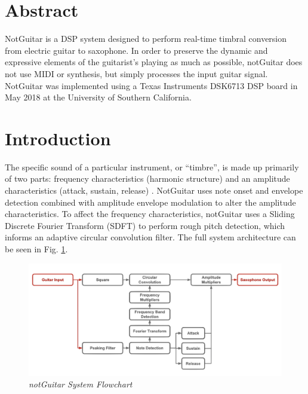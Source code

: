 \documentclass[twoside,a4paper]{article}
\title{\papertitle}
\newif\ifpdf
\begin{document}
\ifpdf %
  \DeclareGraphicsExtensions{.png,.jpg,.pdf}
\else  %
\fi

\maketitle
\section{Abstract}
NotGuitar is a DSP system designed to perform real-time timbral conversion from electric guitar to saxophone.
In order to preserve the dynamic and expressive elements of the guitarist's playing as much as possible,
notGuitar does not use MIDI or synthesis, but simply processes the input guitar signal. 
NotGuitar was implemented using a Texas Instruments DSK6713 DSP board in May 2018 at the University of
Southern California.

\section{Introduction}
The specific sound of a particular instrument, or ``timbre'', is made up primarily of two parts: frequency characteristics
(harmonic structure) and an amplitude characteristics (attack, sustain, release)
\cite{Zolzer:2011:DDA:2028616}. NotGuitar uses note onset and envelope detection combined with
amplitude envelope modulation to alter the amplitude characteristics.
To affect the frequency characteristics, notGuitar uses a Sliding Discrete Fourier Transform (SDFT)
to perform rough pitch detection, which informs
an adaptive circular convolution filter.
The full system architecture can be seen in Fig. \ref{flowchart}.

\begin{figure}[ht]
  \center
  \includegraphics[width=5in]{Pictures/FlowChart.png}
  \caption{\label{flowchart}{\it notGuitar System Flowchart}}
  \end{figure}
\end{document}
